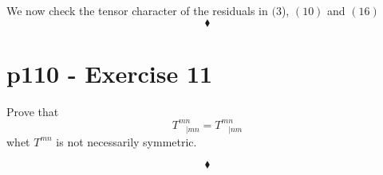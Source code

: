 We now check the tensor character of the residuals in $(3$), $(10)$ and $(16)$
$$\blacklozenge$$
\newpage



\section{p110 - Exercise 11}
\begin{tcolorbox}
Prove that $$T^{mn}_{\ \ \ \ |mn} =T^{mn}_{\ \ \ \ |nm}$$ whet $T^{mn}$ is not necessarily symmetric.
\end{tcolorbox}

$$\blacklozenge$$
\newpage